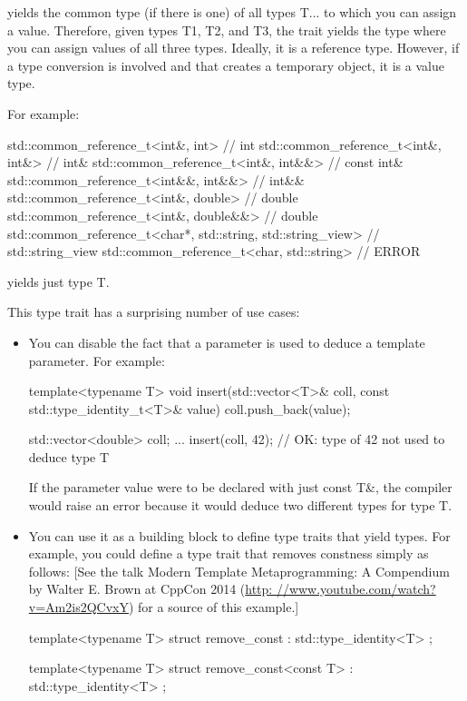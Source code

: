 
yields the common type (if there is one) of all types T... to which you can assign a value. Therefore, given types T1, T2, and T3, the trait yields the type where you can assign values of all three types. Ideally, it is a reference type. However, if a type conversion is involved and that creates a temporary object, it is a value type.

For example:

\begin{cpp}
std::common_reference_t<int&, int> // int
std::common_reference_t<int&, int&> // int&
std::common_reference_t<int&, int&&> // const int&
std::common_reference_t<int&&, int&&> // int&&
std::common_reference_t<int&, double> // double
std::common_reference_t<int&, double&&> // double
std::common_reference_t<char*, std::string, std::string_view> // std::string_view
std::common_reference_t<char, std::string> // ERROR
\end{cpp}



yields just type T.

This type trait has a surprising number of use cases:

\begin{itemize}
\item 
You can disable the fact that a parameter is used to deduce a template parameter. For example:

\begin{cpp}
template<typename T>
void insert(std::vector<T>& coll, const std::type_identity_t<T>& value)
{
	coll.push_back(value);
}

std::vector<double> coll;
...
insert(coll, 42); // OK: type of 42 not used to deduce type T
\end{cpp}

If the parameter value were to be declared with just const T\&, the compiler would raise an error because it would deduce two different types for type T.

\item 
You can use it as a building block to define type traits that yield types. For example, you could define a type trait that removes constness simply as follows: [See the talk Modern Template Metaprogramming: A Compendium by Walter E. Brown at CppCon 2014 (\url{http: //www.youtube.com/watch?v=Am2is2QCvxY}) for a source of this example.]

\begin{cpp}
template<typename T>
struct remove_const : std::type_identity<T> {
};

template<typename T>
struct remove_const<const T> : std::type_identity<T> {
};
\end{cpp}
\end{itemize}




